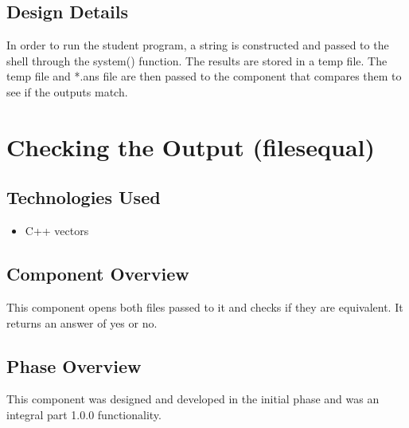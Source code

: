 

\subsection{Design Details}
In order to run the student program, a string is constructed and passed to the shell through the system() function. The results are stored in a temp file. The temp file and *.ans file are then passed to the component that compares them to see if the outputs match.

\section{Checking the Output (filesequal)}

\subsection{Technologies  Used}
\begin{itemize}
    \item C++ vectors
\end{itemize}


\subsection{Component  Overview}
This component opens both files passed to it and checks if they are equivalent. It returns an answer of yes or no.

\subsection{Phase Overview}
This component was designed and developed in the initial phase and was an integral part 1.0.0 functionality.





